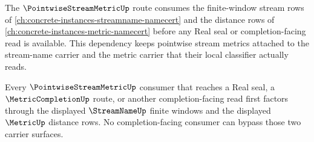 The $\PointwiseStreamMetricUp$ route consumes the finite-window stream rows of \autoref{ch:concrete-instances-streamname-namecert} and the distance rows of \autoref{ch:concrete-instances-metric-namecert} before any Real seal or completion-facing read is available. This dependency keeps pointwise stream metrics attached to the stream-name carrier and the metric carrier that their local classifier actually reads.

\begin{proposition}
\label{prop:pointwise-stream-metric-streamname-metric-dependency}
Every $\PointwiseStreamMetricUp$ consumer that reaches a Real seal, a $\MetricCompletionUp$ route, or another completion-facing read first factors through the displayed $\StreamNameUp$ finite windows and the displayed $\MetricUp$ distance rows. No completion-facing consumer can bypass those two carrier surfaces.
\end{proposition}
